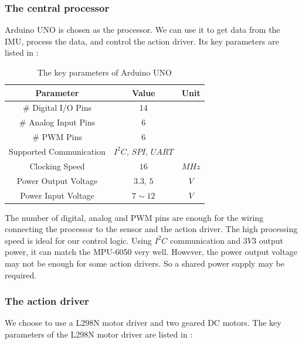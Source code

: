 \documentclass[9pt,a4paper,twocolumn]{tau-class/tau}
\begin{document}
\subsubsection{The central processor}
Arduino UNO is chosen as the processor. We can use it to get data from the IMU, process the data, and control the action driver. Its key parameters are listed in :

\begin{table}[htbp]
    \centering
    \begin{tabular}{c c c}
    \toprule
    \textbf{Parameter} & \textbf{Value} & \textbf{Unit} \\
    \midrule
    \# Digital I/O Pins & $14$ & \\
    \# Analog Input Pins & $6$ & \\
    \# PWM Pins & $6$ & \\
    \midrule
    Supported Communication & $I^2C$, $SPI$, $UART$ & \\
    Clocking Speed & $16$ & $MHz$ \\
    \midrule
    Power Output Voltage & $3.3$, $5$ & $V$ \\
    Power Input Voltage & $7\sim12$ & $V$ \\
    \bottomrule
    \end{tabular}
    \vspace{\baselineskip}
    \caption{The key parameters of Arduino UNO \cite{arduino_uno_datasheet}}
    \label{tab:arduino_uno_specifications}
\end{table}

The number of digital, analog and PWM pins are enough for the wiring connecting the processor to the sensor and the action driver. The high processing speed is ideal for our control logic. Using $I^2C$ communication and $3V3$ output power, it can match the MPU-6050 very well. However, the power output voltage may not be enough for some action drivers. So a shared power supply may be required. 

\subsubsection{The action driver}
We choose to use a L298N motor driver and two geared DC motors. The key parameters of the L298N motor driver are listed in :
\end{document}
